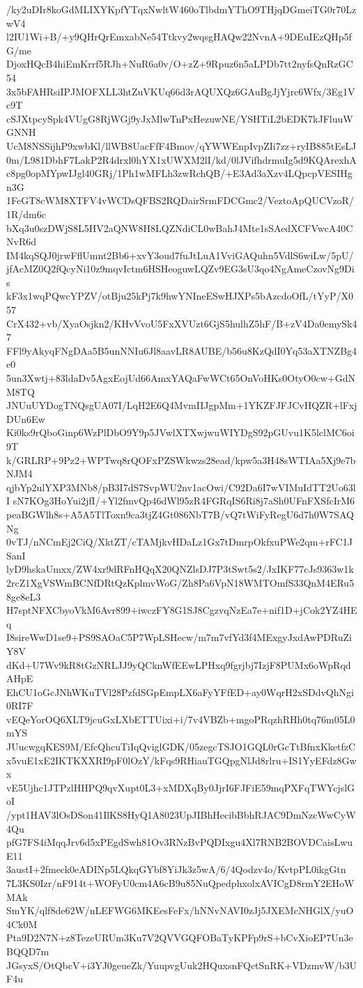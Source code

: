 /ky2uDIr8koGdMLIXYKpfYTqxNwltW460oTlbdmYThO9THjqDGmeiTG0r70LzwV4
l2IU1Wi+B/+y9QHrQrEmxabNe54Ttkvy2wqsgHAQw22NvnA+9DEuIEzQHp5fG/me
DjoxHQcB4hiEmKrrf5RJh+NuR6a0v/O+zZ+9Rpuz6n5aLPDb7tt2nyfsQnRzGC54
3x5bFAHRsiIPJMOFXLL3htZuVKUq66d3rAQUXQz6GAuBgJjYjrc6Wfx/3Eg1Vc9T
cSJXtpcySpk4VUgG8RjWGj9yJxMlwTnPxHezuwNE/YSHTiL2bEDK7kJFluuWGNNH
UcM8NSSijhP9xwbKl/llWB8UacFfF4Bmov/qYWWEnpIvpZIi7zz+ryIB885tEsLJ
0m/L981DbhF7LakP2R4drxl0hYX1xUWXM2lI/kd/0lJVifhdrmuIg5d9KQArexhA
c8pg0opMYpwIJgl40GRj/1Ph1wMFLh3zwRchQB/+E3Ad3aXzv4LQpcpVESIHgn3G
1FeGT8cWM8XTFV4vWCDsQFBS2RQDairSrmFDCGmc2/VeztoApQUCVzoR/1R/dm6c
bXq3u0szDWjS8L5HV2aQNW8H8LQZNdiCL0wBahJ4Mte1sSAedXCFVwcA40CNvR6d
IM4kqSQJ0jrwFflUmnt2Bb6+xvY3oud7fuJtLuA1VviGAQuhn5VdlS6wiLw/5pU/
jfAcMZ0Q2fQcyNi10z9mqvIctm6HSHeoguwLQZv9EG3sU3qo4NgAmeCzovNg9Dis
kF3x1wqPQwcYPZV/otBju25kPj7k9hwYNIneESwHJXPs5bAzcdoOfL/tYyP/X057
CrX432+vb/XyaOsjkn2/KHvVvoU5FxXVUzt6GjS5hulhZ5hF/B+zV4Da0emySk47
FFl9yAkyqFNgDAa5B5unNNIu6Jl8aavLR8AUBE/b56u8KzQdI0Yq53aXTNZBg4e0
5un3Xwtj+83ldaDv5AgxEojUd66AmxYAQaFwWCt65OnVoHKs0OtyO0cw+GdNM8TQ
JNUuUYDogTNQsgUA07I/LqH2E6Q4MvmIIJgpMm+1YKZFJFJCvHQZR+lFxjDUn6Ew
Ki0ks9rQboGinp6WzPlDbO9Y9p5JVwlXTXwjwuWIYDgS92pGUvu1K5lclMC6oi9T
k/GRLRP+9Pz2+WPTwq8rQOFxPZSWkwzs28ead/kpw5a3H48sWTIAa5Xj9e7bNJM4
qjbYp2ulYXP3MNb8/pB3I7dS7SvpWU2nv1acOwi/C92Da6I7wVIMuIdTT2Uo63lI
sN7KOg3HoYui2jfI/+Yl2fmvQp46dWl95zR4FGRqIS6Ri8j7aSh0UFnFXSfcIrM6
peaBGWlh8s+A5A5TlToxn9ca3tjZ4Gt086NbT7B/vQ7tWiFyRegU6d7h0W7SAQNg
0vTJ/nNCmEj2CiQ/XktZT/cTAMjkvHDaLz1Gx7tDmrpOkfxuPWe2qm+rFC1JSanI
lyD9hskaUmxx/ZW4xr9dRFnHQqX20QNZlsDJ7P3tSwt5s2/JxIKF77cJs9363w1k
2rcZ1XgVSWmBCNfDRtQzKplmvWoG/Zh8Pa6VpN18WMTOmfS33QnM4ERu58ge8eL3
H7sptNFXCbyoVkM6Avr899+iwczFY8G1SJ8CgzvqNzEa7e+nif1D+jCok2YZ4HEq
I8sireWwD1se9+PS9SAOaC5P7WpLSHecw/m7m7vfYd3f4MExgyJxdAwPDRuZiY8V
dKd+U7Wv9kR8tGzNRLJJ9yQCknWfEEwLPHxq9fgrjbj7IzjF8PUMx6oWpRqdAHpE
EhCU1oGcJNhWKuTVl28PzfdSGpEmpLX6aFyYFfED+ay0WqrH2xSDdvQhNgi0RI7F
vEQeYorOQ6XLT9jcuGxLXbETTUixi+i/7v4VBZb+mgoPRqzhRHh0tq76m05L0mYS
JUucwgqKES9M/EfcQhcuTiIqQviglGDK/05zegcTSJO1GQL0rGcTtBfnxKketfzC
x5vuE1xE2IKTKXXRI9pF0lOzY/kFqs9RHiauTGQpgNlJd8rlru+IS1YyEFdz8Gwx
vE5Ujhc1JTPzlHHPQ9qvXupt0L3+xMDXqBy0JjrI6FJFiE59mqPXFqTWYcjslGoI
/ypt1HAV3lOsDSon41IlKS8HyQ1A8023UpJIBhHecibBbhRJAC9DmNzcWwCyW4Qu
pfG7FS4iMqqJrv6d5xPEgdSwh81Ov3RNzBvPQDIxgu4Xl7RNB2BOVDCaisLwuE11
3austI+2fmeck0eADINp5LQkqGYbf8YiJk3z5wA/6/4Qodzv4o/KvtpPL0ikgGtn
7L3KS0Izr/nF914t+WOFyU0cm4A6cB9u85NuQpedphxolxAVICgD8rmY2EHoWMAk
SmYK/qlf8de62W/nLEFWG6MKEesFeFx/hNNvNAVI0zJj5JXEMcNHGlX/yuO4Ck0M
Pta9D2N7N+z8TezeURUm3Ku7V2QVVGQFOBaTyKPFp9rS+bCvXioEP7Un3eBQQD7m
JGsyxS/OtQbcV+i3YJ0geueZk/YuupvgUuk2HQuxsnFQctSnRK+VDzmvW/b3UF4u
